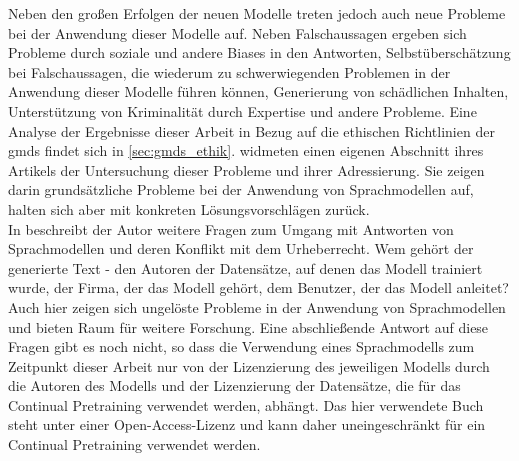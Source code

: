 Neben den großen Erfolgen der neuen Modelle treten jedoch auch neue Probleme bei der Anwendung dieser Modelle auf.
Neben Falschaussagen ergeben sich Probleme durch soziale und andere Biases in den Antworten, Selbstüberschätzung bei Falschaussagen,
die wiederum zu schwerwiegenden Problemen in der Anwendung dieser Modelle führen können, Generierung von schädlichen Inhalten, Unterstützung von Kriminalität durch Expertise und andere Probleme.
Eine Analyse der Ergebnisse dieser Arbeit in Bezug auf die ethischen Richtlinien der \ac{gmds} findet sich in \cref{sec:gmds_ethik}.
\citet{gpt4} widmeten einen eigenen Abschnitt ihres Artikels der Untersuchung dieser Probleme und ihrer Adressierung.
Sie zeigen darin grundsätzliche Probleme bei der Anwendung von Sprachmodellen auf, halten sich aber mit konkreten Lösungsvorschlägen zurück.\\

In \citet{plagiarism} beschreibt der Autor weitere Fragen zum Umgang mit Antworten von Sprachmodellen und deren Konflikt mit dem Urheberrecht.
Wem gehört der generierte Text - den Autoren der Datensätze, auf denen das Modell trainiert wurde, der Firma, der das Modell gehört, dem Benutzer, der das Modell anleitet? 
Auch hier zeigen sich ungelöste Probleme in der Anwendung von Sprachmodellen und bieten Raum für weitere Forschung.
Eine abschließende Antwort auf diese Fragen gibt es noch nicht,
so dass die Verwendung eines Sprachmodells zum Zeitpunkt dieser Arbeit nur von der Lizenzierung des jeweiligen Modells durch die Autoren des Modells und der Lizenzierung der Datensätze,
die für das Continual Pretraining verwendet werden, abhängt.
Das hier verwendete Buch \citet{bb} steht unter einer Open-Access-Lizenz und kann daher uneingeschränkt für ein Continual Pretraining verwendet werden.\\
